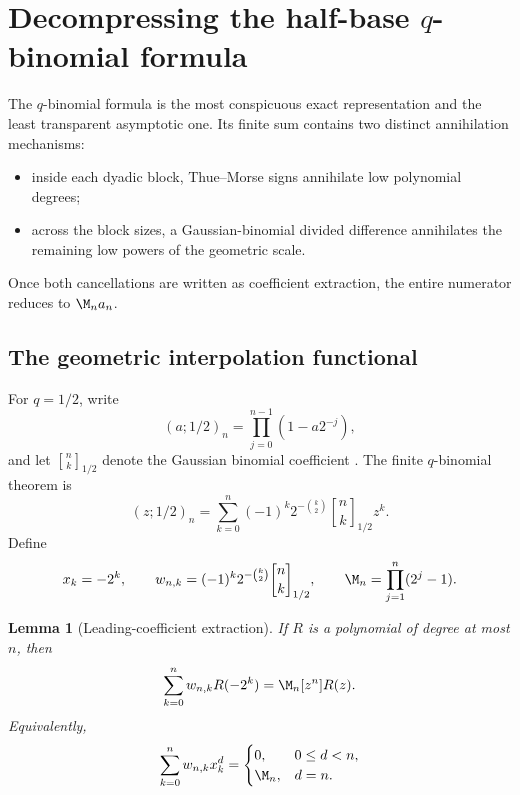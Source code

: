 \documentclass[11pt,oneside]{article}
\newtheorem{lemma}[theorem]{Lemma}
\theoremstyle{definition}
\theoremstyle{remark}
\newcommand{\qbinom}[3]{\genfrac{[}{]}{0pt}{}{#1}{#2}_{#3}}
\begin{document}
\section{Decompressing the half-base \texorpdfstring{$q$}{q}-binomial formula}
\label{dyadicasym:sec:q-decompression}

The $q$-binomial formula is the most conspicuous exact representation and the least transparent
asymptotic one.  Its finite sum contains two distinct annihilation mechanisms:

\begin{itemize}
\item inside each dyadic block, Thue--Morse signs annihilate low polynomial degrees;
\item across the block sizes, a Gaussian-binomial divided difference annihilates the remaining
low powers of the geometric scale.
\end{itemize}

Once both cancellations are written as coefficient extraction, the entire numerator reduces
to $\M_na_n$.

\subsection{The geometric interpolation functional}

For $q=1/2$, write
\begin{equation}
 (a;1/2)_n=\prod_{j=0}^{n-1}(1-a2^{-j}),                    \label{dyadicasym:eq:qpoch}
\end{equation}
and let $\qbinom nk{1/2}$ denote the Gaussian binomial coefficient
\cite{dyadicasym:andrews1976,dyadicasym:gasper2004,dyadicasym:kac2002,dyadicasym:dlmf17}.  The finite
$q$-binomial theorem is
\begin{equation}
 (z;1/2)_n=\sum_{k=0}^n
 (-1)^k2^{-\binom k2}\qbinom nk{1/2}z^k.                   \label{dyadicasym:eq:q-binomial-theorem}
\end{equation}
Define
\begin{equation}
 x_k=-2^k,
 \qquad
 w_{n,k}=(-1)^k2^{-\binom k2}\qbinom nk{1/2},
 \qquad
 \M_n=\prod_{j=1}^n(2^j-1).                                \label{dyadicasym:eq:q-weights}
\end{equation}

\begin{lemma}[Leading-coefficient extraction]
\label{dyadicasym:lem:q-leading}
If $R$ is a polynomial of degree at most $n$, then
\begin{equation}
 \sum_{k=0}^nw_{n,k}R(-2^k)=\M_n[z^n]R(z).                 \label{dyadicasym:eq:q-leading}
\end{equation}
Equivalently,
\begin{equation}
 \sum_{k=0}^nw_{n,k}x_k^d=
 \begin{cases}
 0,&0\le d<n,\\
 \M_n,&d=n.
 \end{cases}                                                \label{dyadicasym:eq:q-monomials}
\end{equation}
\end{lemma}
\end{document}
